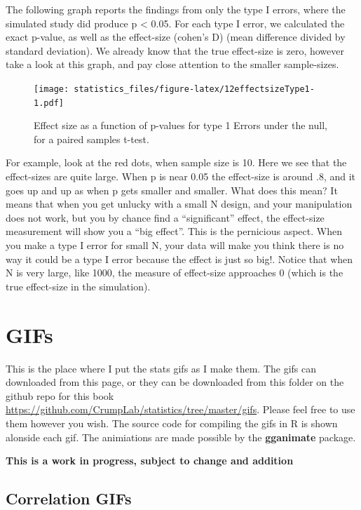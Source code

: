 \documentclass[]{book}
\begin{document}
The following graph reports the findings from only the type I errors, where the simulated study did produce p \textless{} 0.05. For each type I error, we calculated the exact p-value, as well as the effect-size (cohen's D) (mean difference divided by standard deviation). We already know that the true effect-size is zero, however take a look at this graph, and pay close attention to the smaller sample-sizes.

\begin{figure}
\centering
\texttt{[image: statistics\_files/figure-latex/12effectsizeType1-1.pdf]}
\caption{\label{fig:12effectsizeType1}Effect size as a function of p-values for type 1 Errors under the null, for a paired samples t-test.}
\end{figure}

For example, look at the red dots, when sample size is 10. Here we see that the effect-sizes are quite large. When p is near 0.05 the effect-size is around .8, and it goes up and up as when p gets smaller and smaller. What does this mean? It means that when you get unlucky with a small N design, and your manipulation does not work, but you by chance find a ``significant'' effect, the effect-size measurement will show you a ``big effect''. This is the pernicious aspect. When you make a type I error for small N, your data will make you think there is no way it could be a type I error because the effect is just so big!. Notice that when N is very large, like 1000, the measure of effect-size approaches 0 (which is the true effect-size in the simulation).

\hypertarget{gifs}{%
\chapter{GIFs}\label{gifs}}

This is the place where I put the stats gifs as I make them. The gifs can downloaded from this page, or they can be downloaded from this folder on the github repo for this book \url{https://github.com/CrumpLab/statistics/tree/master/gifs}. Please feel free to use them however you wish. The source code for compiling the gifs in R is shown alonside each gif. The animiations are made possible by the \textbf{gganimate} package.

\textbf{This is a work in progress, subject to change and addition}

\hypertarget{correlation-gifs}{%
\section{Correlation GIFs}\label{correlation-gifs}}
\end{document}
